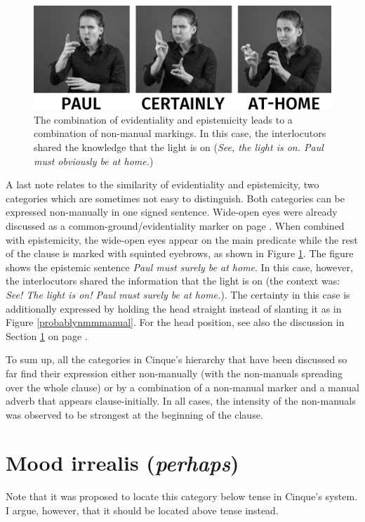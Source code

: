 \begin{figure}[bt]
\centering
	\includegraphics[width=1.0\textwidth]{epistemicobvioussw.jpg}
	\caption{The combination of evidentiality and epistemicity leads to a combination of non-manual markings. In this case, the interlocutors shared the knowledge that the light is on (\textit{See, the light is on. Paul must obviously be at home.})}
	\label{epistemicobvious}
\end{figure}

A last note relates to the similarity of evidentiality and epistemicity, two categories which are sometimes not easy to distinguish. Both categories can be expressed non-manually in one signed sentence. Wide-open eyes were already discussed as a common-ground/evidentiality marker on page \pageref{obviousness}. When combined with epistemicity, the wide-open eyes appear on the main predicate while the rest of the clause is marked with squinted eyebrows, as shown in Figure \ref{epistemicobvious}. The figure shows the epistemic sentence \textit{Paul must surely be at home}. In this case, however, the interlocutors shared the information that the light is on (the context was: \textit{See! The light is on! Paul must surely be at home.}). The certainty in this case is additionally expressed by holding the head straight instead of slanting it as in Figure \ref{probablynmmmanual}. For the head position, see also the discussion in Section \ref{perhapsmoodirrealis} on page \pageref{perhapsmoodirrealis}.

To sum up, all the categories in Cinque's hierarchy that have been discussed so far find their expression either non-manually (with the non-manuals spreading over the whole clause) or by a combination of a non-manual marker and a manual adverb that appears clause-initially. In all cases, the intensity of the non-manuals was observed to be strongest at the beginning of the clause.




\section{Mood irrealis (\textit{perhaps})}\label{perhapsmoodirrealis}
Note that it was proposed to locate this category below tense in Cinque's system. I argue, however, that it should be located above tense instead.


